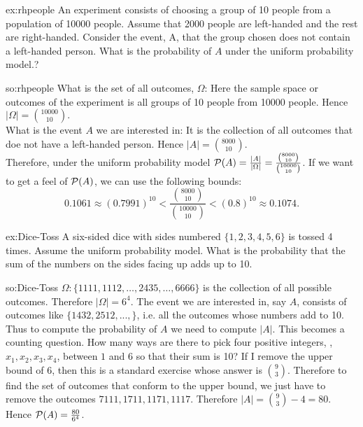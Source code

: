 \begin{excr}{ex:rhpeople}
 An experiment consists of choosing a group of 10 people from a population of 10000 people. Assume that 2000 people are left-handed and the rest are right-handed. Consider the event, A, that the group chosen does not contain a left-handed person. What is the probability of $A$ under the uniform probability model.?
\end{excr}
\begin{soln}{so:rhpeople}
What is the set of all outcomes, $\Omega$: Here the sample space or outcomes of the experiment is  all groups of 10 people from 10000 people. Hence $|\Omega|=\binom{10000}{10}.$ \\
What is the event $A$ we are interested in: It is the collection of all outcomes that doe not have a left-handed person. Hence $|A|=\binom{8000}{10}$.\\
Therefore, under the uniform probability model $\mathcal{P}(A) = \frac{|A|}{|\Omega|} = \frac{\binom{8000}{10}}{\binom{10000}{10}}$. If we want to get a feel of $\mathcal{P}(A)$, we can use the following bounds:
$$0.1061 \approx (0.7991)^{10} <  \frac{\binom{8000}{10}}{\binom{10000}{10}} < (0.8)^{10} \approx 0.1074.$$
\end{soln}

 \begin{excr}{ex:Dice-Toss}
 A six-sided dice with sides numbered $\{1,2,3,4,5,6\}$ is tossed 4 times. Assume the uniform probability model. What is the probability that the sum of the numbers on the sides facing up adds up to 10.
 \end{excr}
 \begin{soln}{so:Dice-Toss}
 $\Omega: \{1111,1112,\ldots,2435, \ldots, 6666  \}$ is the collection of all possible outcomes. Therefore $|\Omega| = 6^4$. The event we are interested in, say $A$, consists of outcomes like $\{1432, 2512,...,\}$, i.e. all the outcomes whose numbers add to 10. Thus to compute the probability of $A$ we need to compute $|A|$. This becomes a counting question. How many ways are there to pick four positive integers, , $x_1, x_2, x_3, x_4$, between $1$ and $6$ so that their sum is 10? If I remove the upper bound of $6$, then this is a standard exercise whose answer is $\binom{9}{3}$. Therefore to find the set of outcomes that conform to the upper bound, we just have to remove the outcomes $7111,1711,1171,1117$. Therefore $|A|=\binom{9}{3} - 4 =80$. Hence $\mathcal{P}(A) = \frac{80}{6^4}$.
 \end{soln}

